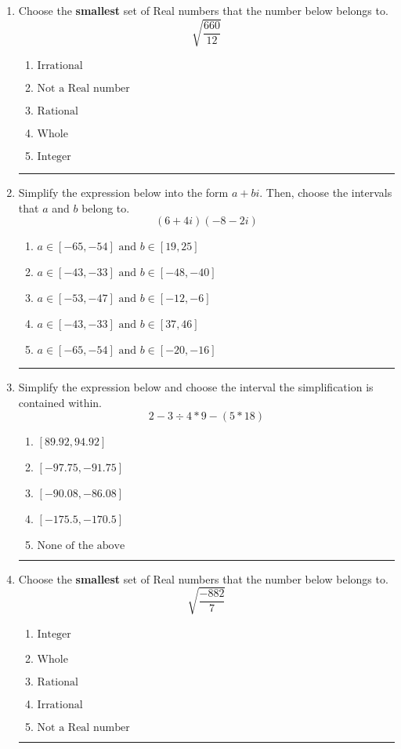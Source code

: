 \documentclass[14pt]{extbook}
\newcommand{\litem}[1]{\item#1\hspace*{-1cm}\rule{\textwidth}{0.4pt}}
\begin{document}
\begin{enumerate}
{\begin{enumerate}[label=\Alph*.]
\end{enumerate} }
\litem{
Choose the \textbf{smallest} set of Real numbers that the number below belongs to.\[ \sqrt{\frac{660}{12}} \]\begin{enumerate}[label=\Alph*.]
\item \( \text{Irrational} \)
\item \( \text{Not a Real number} \)
\item \( \text{Rational} \)
\item \( \text{Whole} \)
\item \( \text{Integer} \)

\end{enumerate} }
\litem{
Simplify the expression below into the form $a+bi$. Then, choose the intervals that $a$ and $b$ belong to.\[ (6 + 4 i)(-8 - 2 i) \]\begin{enumerate}[label=\Alph*.]
\item \( a \in [-65, -54] \text{ and } b \in [19, 25] \)
\item \( a \in [-43, -33] \text{ and } b \in [-48, -40] \)
\item \( a \in [-53, -47] \text{ and } b \in [-12, -6] \)
\item \( a \in [-43, -33] \text{ and } b \in [37, 46] \)
\item \( a \in [-65, -54] \text{ and } b \in [-20, -16] \)

\end{enumerate} }
\litem{
Simplify the expression below and choose the interval the simplification is contained within.\[ 2 - 3 \div 4 * 9 - (5 * 18) \]\begin{enumerate}[label=\Alph*.]
\item \( [89.92, 94.92] \)
\item \( [-97.75, -91.75] \)
\item \( [-90.08, -86.08] \)
\item \( [-175.5, -170.5] \)
\item \( \text{None of the above} \)

\end{enumerate} }
\litem{
Choose the \textbf{smallest} set of Real numbers that the number below belongs to.\[ \sqrt{\frac{-882}{7}} \]\begin{enumerate}[label=\Alph*.]
\item \( \text{Integer} \)
\item \( \text{Whole} \)
\item \( \text{Rational} \)
\item \( \text{Irrational} \)
\item \( \text{Not a Real number} \)


\end{enumerate}}
\end{enumerate}
\end{document}
